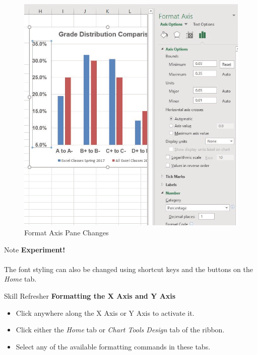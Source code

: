 \begin{figure}[H]
	\centering
	\includegraphics[width=\maxwidth{.95\linewidth}]{gfx/ch04_fig30}
	\caption{Format Axis Pane Changes}
	\label{04:fig30}
\end{figure}

\begin{center}
	\begin{infobox}{Note}
		\textbf{Experiment!}
		\\
		\\
		The font styling can also be changed using shortcut keys and the buttons on the \textit{Home} tab.
	\end{infobox}
\end{center}

\begin{center}
	\begin{sklbox}{Skill Refresher}
		\textbf{Formatting the X Axis and Y Axis}
		\\
		\begin{itemize}
			\setlength{\itemsep}{0pt}
			\setlength{\parskip}{0pt}
			\setlength{\parsep}{0pt}

			\item Click anywhere along the X Axis or Y Axis to activate it.
			\item Click either the \textit{Home} tab or \textit{Chart Tools Design} tab of the ribbon.
			\item Select any of the available formatting commands in these tabs.
			
		\end{itemize}
	\end{sklbox}
\end{center}

